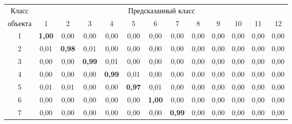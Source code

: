 \begin{table}\small %


\begin{center}


\parbox{380pt}{





}


\label{tbl:hyperparams_confusion}


\vspace*{2ex}





\begin{tabular}{|c|c|c|c|c|c|c|c|c|c|c|c|c|}


  \hline


Класс & \multicolumn{12}{c|}{Предсказанный класс} \\ 


\cline{2-13}


объекта & 1 & 2 & 3 & 4 & 5 & 6 & 7 & 8& 9 & 10 & 11 & 12\\ 


\hline


 1 & \textbf{1{,}00} & 0,00 & 0,00 & 0,00 & 0,00 & 0,00 & 0,00 & 0,00 & 0,00 & 0,00 & 0,00 & 0,00\\ 


 2 & 0,01 & \textbf{0,98} & 0,01 & 0,00 & 0,00 & 0,00 & 0,00 & 0,00 & 0,00 & 0,00 & 0,00 & 0,00\\ 


 3 & 0,00 & 0,00 & \textbf{0{,}99} & 0,01 & 0,00 & 0,00 & 0,00 & 0,00 & 0,00 & 0,00 & 0,00 & 0,00\\ 


 4 & 0,00 & 0,00 & 0,00 & \textbf{0{,}99} & 0,01 & 0,00 & 0,00 & 0,00 & 0,00 & 0,00 & 0,00 & 0,00\\ 


 5 & 0,01 & 0,01 & 0,00 & 0,00 & \textbf{0{,}97} & 0,01 & 0,00 & 0,00 & 0,00 & 0,00 & 0,00 & 0,00\\ 


 6 & 0,00 & 0,00 & 0,00 & 0,00 & 0,00 & \textbf{1{,}00} & 0,00 & 0,00 & 0,00 & 0,00 & 0,00 & 0,00\\ 


 7 & 0,00 & 0,00 & 0,00 & 0,00 & 0,00 & 0,00 & \textbf{0{,}99} & 0,00 & 0,00 & 0,00 & 0,00 & 0,00\\ 



\end{tabular}
\end{center}
\end{table}
